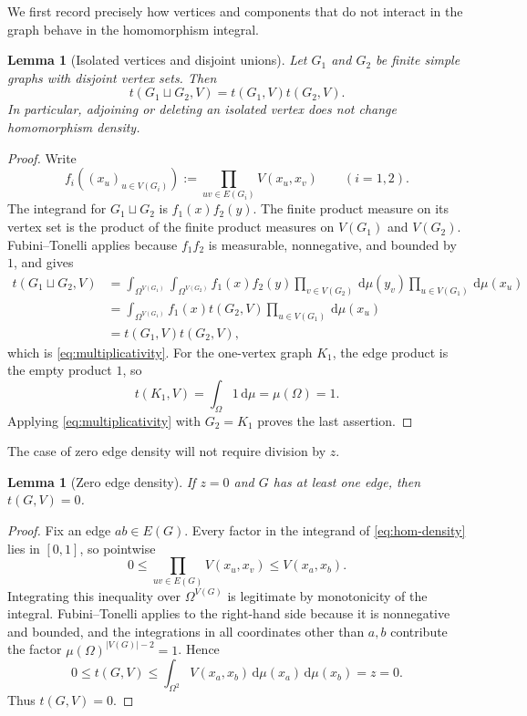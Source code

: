 \documentclass[11pt]{article}
\newtheorem{lemma}[theorem]{Lemma}
\newcommand{\dd}{\,\mathrm{d}}
\begin{document}
We first record precisely how vertices and components that do not
interact in the graph behave in the homomorphism integral.

\begin{lemma}[Isolated vertices and disjoint unions]
\label{lem:components}
Let $G_1$ and $G_2$ be finite simple graphs with disjoint vertex sets.
Then
\begin{equation}
t(G_1\sqcup G_2,V)=t(G_1,V)t(G_2,V).
\label{eq:multiplicativity}
\end{equation}
In particular, adjoining or deleting an isolated vertex does not change
homomorphism density.
\end{lemma}

\begin{proof}
Write
\[
f_i((x_u)_{u\in V(G_i)})
:=\prod_{uv\in E(G_i)}V(x_u,x_v)
\qquad (i=1,2).
\]
The integrand for $G_1\sqcup G_2$ is $f_1(x)f_2(y)$.  The finite product
measure on its vertex set is the product of the finite product measures
on $V(G_1)$ and $V(G_2)$.  Fubini--Tonelli applies because
$f_1f_2$ is measurable, nonnegative, and bounded by $1$, and gives
\begin{align*}
t(G_1\sqcup G_2,V)
&=\int_{\Omega^{V(G_1)}}\int_{\Omega^{V(G_2)}}
f_1(x)f_2(y)\prod_{v\in V(G_2)}\dd\mu(y_v)
\prod_{u\in V(G_1)}\dd\mu(x_u)
\\
&=\int_{\Omega^{V(G_1)}}
f_1(x)t(G_2,V)\prod_{u\in V(G_1)}\dd\mu(x_u)
\\
&=t(G_1,V)t(G_2,V),
\end{align*}
which is \eqref{eq:multiplicativity}.  For the one-vertex graph $K_1$,
the edge product is the empty product $1$, so
\[
t(K_1,V)=\int_\Omega1\dd\mu=\mu(\Omega)=1.
\]
Applying \eqref{eq:multiplicativity} with $G_2=K_1$ proves the last
assertion.
\end{proof}

The case of zero edge density will not require division by $z$.

\begin{lemma}[Zero edge density]
\label{lem:zero}
If $z=0$ and $G$ has at least one edge, then $t(G,V)=0$.
\end{lemma}

\begin{proof}
Fix an edge $ab\in E(G)$.  Every factor in the integrand of
\eqref{eq:hom-density} lies in $[0,1]$, so pointwise
\[
0\leq \prod_{uv\in E(G)}V(x_u,x_v)\leq V(x_a,x_b).
\]
Integrating this inequality over $\Omega^{V(G)}$ is legitimate by
monotonicity of the integral.  Fubini--Tonelli applies to the right-hand
side because it is nonnegative and bounded, and the integrations in all
coordinates other than $a,b$ contribute the factor
$\mu(\Omega)^{|V(G)|-2}=1$.  Hence
\[
0\leq t(G,V)\leq
\int_{\Omega^2}V(x_a,x_b)\dd\mu(x_a)\dd\mu(x_b)=z=0.
\]
Thus $t(G,V)=0$.
\end{proof}
\end{document}
